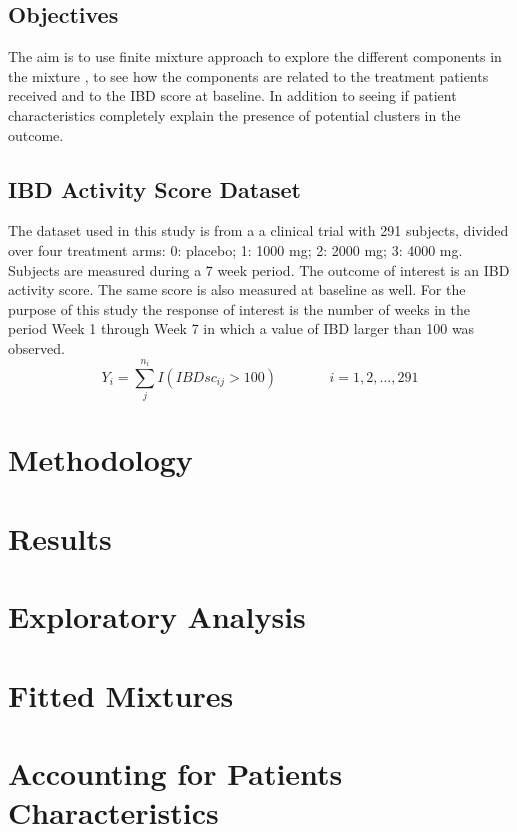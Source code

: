 \documentclass[11pt]{article}\usepackage[]{graphicx}\usepackage[]{color}
\begin{document}


\subsection*{Objectives}
The aim is to use finite mixture approach to explore the different components in the mixture , to see how the components are related to the treatment patients received and to the IBD score at baseline. In addition to seeing if patient characteristics completely explain the presence of potential clusters in the outcome.
\subsection*{IBD Activity Score Dataset}
The dataset used in this study is from a a clinical trial with 291 subjects, divided over four treatment arms: 0: placebo; 1: 1000 mg; 2: 2000 mg; 3: 4000 mg. Subjects are measured during a 7 week period. The outcome of interest is an IBD activity score. The same score is also measured at baseline as well. For the purpose of this study the response of interest is the number of weeks in the period Week 1 through Week 7 in which a value of IBD larger than 100 was observed.
$$ Y_{i} = \sum_{j}^{n_{i}} I(IBDsc_{ij} > 100) \ \ \ \ \ \ \ \ \ \ \ \ \ \ \ \ \ i = 1,2,...,291$$


\section*{Methodology}

\section*{Results}

\section*{Exploratory Analysis}

\section*{Fitted Mixtures}

\section*{Accounting for Patients Characteristics}
\end{document}
